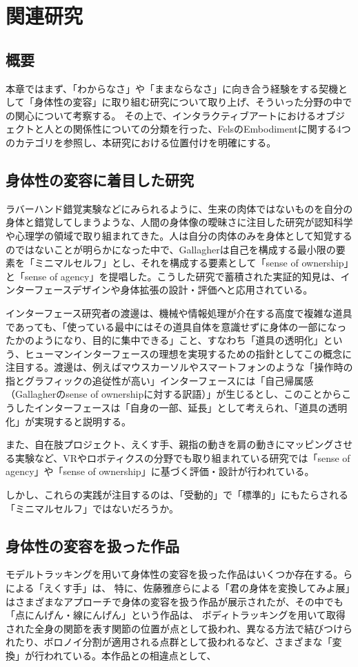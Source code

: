 \chapter{関連研究}
\label{related_works}
\section{概要}
本章ではまず、「わからなさ」や「ままならなさ」に向き合う経験をする契機として「身体性の変容」に取り組む研究について取り上げ、そういった分野の中での関心について考察する。
その上で、インタラクティブアートにおけるオブジェクトと人との関係性についての分類を行った、FelsのEmbodimentに関する4つのカテゴリを参照し、本研究における位置付けを明確にする。

\section{身体性の変容に着目した研究}
ラバーハンド錯覚実験などにみられるように、生来の肉体ではないものを自分の身体と錯覚してしまうような、人間の身体像の曖昧さに注目した研究が認知科学や心理学の領域で取り組まれてきた。人は自分の肉体のみを身体として知覚するのではないことが明らかになった中で、Gallagher\cite{Gallagher2000}は自己を構成する最小限の要素を「ミニマルセルフ」とし、それを構成する要素として「sense of ownership」と「sense of agency」を提唱した。こうした研究で蓄積された実証的知見は、インターフェースデザインや身体拡張の設計・評価へと応用されている。

インターフェース研究者の渡邊は、機械や情報処理が介在する高度で複雑な道具であっても、「使っている最中にはその道具自体を意識せずに身体の一部になったかのようになり、目的に集中できる」こと、すなわち「道具の透明化」という、ヒューマンインターフェースの理想を実現するための指針としてこの概念に注目する。渡邊は、例えばマウスカーソルやスマートフォンのような「操作時の指とグラフィックの追従性が高い」インターフェースには「自己帰属感（Gallagherのsense of ownershipに対する訳語）」が生じるとし、このことからこうしたインターフェースは「自身の一部、延長」として考えられ、「道具の透明化」が実現すると説明する\cite{Watanabe2013}。

また、自在肢プロジェクト、えくす手、親指の動きを肩の動きにマッピングさせる実験など、VRやロボティクスの分野でも取り組まれている研究では「sense of agency」や「sense of ownership」に基づく評価・設計が行われている。

しかし、これらの実践が注目するのは、「受動的」で「標準的」にもたらされる「ミニマルセルフ」ではないだろうか。

\section{身体性の変容を扱った作品}
モデルトラッキングを用いて身体性の変容を扱った作品はいくつか存在する。らによる「えくす手」\cite{ekusute}は、
特に、佐藤雅彦らによる「君の身体を変換してみよ展」はさまざまなアプローチで身体の変容を扱う作品が展示されたが、その中でも「点にんげん・線にんげん」という作品は、
ボディトラッキングを用いて取得された全身の関節を表す関節の位置が点として扱われ、異なる方法で結びつけられたり、ボロノイ分割が適用される点群として扱われるなど、さまざまな「変換」が行われている。本作品との相違点として、


